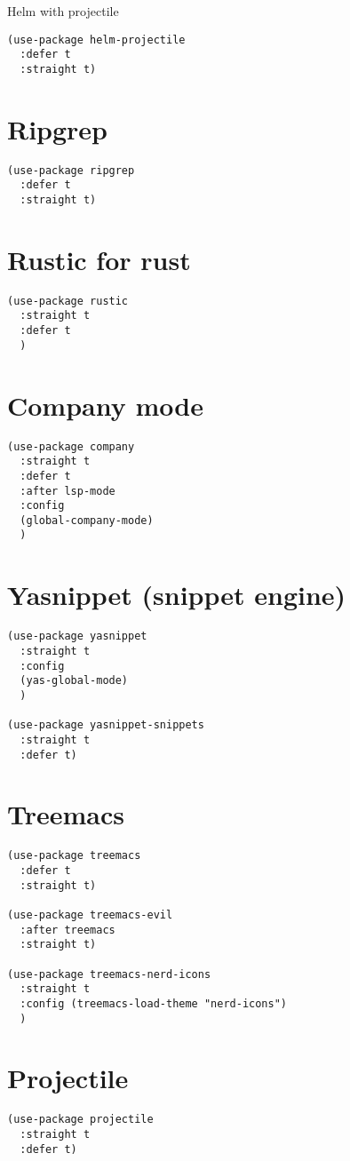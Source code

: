 \documentclass[11pt]{article}
\begin{document}
Helm with projectile
\begin{verbatim}
(use-package helm-projectile
  :defer t
  :straight t)
\end{verbatim}
\section{Ripgrep}
\label{sec:orgfb63ed2}
\begin{verbatim}
(use-package ripgrep
  :defer t
  :straight t)
\end{verbatim}
\section{Rustic for rust}
\label{sec:org452cee9}
\begin{verbatim}
(use-package rustic
  :straight t
  :defer t
  )
\end{verbatim}
\section{Company mode}
\label{sec:orgf6c54f5}
\begin{verbatim}
(use-package company
  :straight t
  :defer t
  :after lsp-mode
  :config
  (global-company-mode)
  ) 
\end{verbatim}
\section{Yasnippet (snippet engine)}
\label{sec:orgfd23841}
\begin{verbatim}
(use-package yasnippet
  :straight t
  :config
  (yas-global-mode)
  )

(use-package yasnippet-snippets
  :straight t
  :defer t)
\end{verbatim}
\section{Treemacs}
\label{sec:org007abf3}
\begin{verbatim}
(use-package treemacs
  :defer t
  :straight t)

(use-package treemacs-evil
  :after treemacs
  :straight t)

(use-package treemacs-nerd-icons
  :straight t
  :config (treemacs-load-theme "nerd-icons")
  )
\end{verbatim}
\section{Projectile}
\label{sec:org2ee15c1}
\begin{verbatim}
(use-package projectile
  :straight t
  :defer t)
\end{verbatim}
\end{document}
